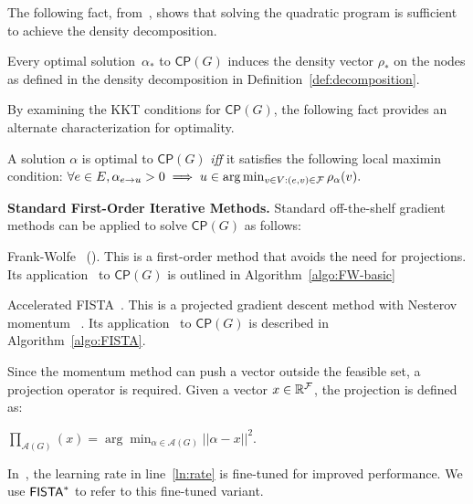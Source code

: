 The following fact, from~\cite{fujishige1980lexicographically,DBLP:conf/www/DanischCS17},
shows that solving the quadratic program is sufficient to achieve the density decomposition.


\begin{fact}\label{fact:QD-Decom}
	Every optimal solution~$\alpha_*$ to $\mathsf{CP}(G)$ induces the
	density vector $\rho_*$ on the nodes as defined in the density decomposition
	in Definition~\ref{def:decomposition}.
\end{fact}

By examining the KKT conditions for $\mathsf{CP}(G)$,
the following fact provides an alternate characterization for optimality.

\begin{fact}
\label{fact:loc-maxmin}
A solution $\alpha$ is optimal to $\mathsf{CP}(G)$ \emph{iff} it satisfies the
following local maximin condition: 
$\forall e \in E, \alpha_{e\to u} > 0 \implies u \in \arg \min_{v \in V:(e, v) \in \mathcal {F}} \rho_{\alpha}(v).$
\end{fact}


\noindent \textbf{Standard First-Order Iterative Methods.}
Standard off-the-shelf gradient methods can be applied to solve $\mathsf{CP}(G)$ as follows:


\begin{compactitem}

\item Frank-Wolfe~\cite{DBLP:conf/icml/Jaggi13} (\fw).  
This is a first-order method that avoids the need for projections. 
Its application~\cite{DBLP:conf/www/DanischCS17}
to $\mathsf{CP}(G)$ is outlined in Algorithm~\ref{algo:FW-basic}



\item Accelerated FISTA~\cite{beck2009fast}.
This is a projected gradient descent method with Nesterov momentum
~\cite{Nesterov1983AMF}.
Its application~\cite{DBLP:conf/nips/HarbQC22} to $\mathsf{CP}(G)$
is described in Algorithm~\ref{algo:FISTA}.


Since the momentum method can push a vector outside the feasible set, 
a projection operator is required. 
Given a vector $x \in \mathbb{R}^{\mathcal {F}}$, the projection is defined as:


$\prod_{\mathcal{A}(G)}(x) = \arg \min_{\alpha \in \mathcal{A}(G)} || \alpha - x ||^2$. 

In~\cite{DBLP:conf/nips/HarbQC22},
the learning rate in line~\ref{ln:rate} is fine-tuned for improved performance. 
We use $\mathsf{FISTA}^*$ to refer to this fine-tuned variant.

\end{compactitem}


